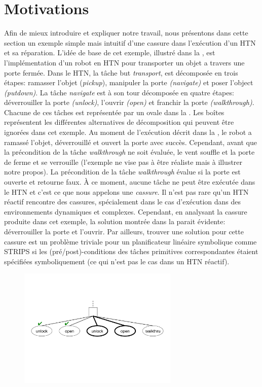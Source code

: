 \documentclass[a4paper,twoside,french]{article}
\begin{document}
		\section{Motivations}
		Afin de mieux introduire et expliquer notre travail, nous présentons dans cette section un exemple simple mais intuitif d'une cassure dans l'exécution d'un HTN et sa réparation. L'idée de base de cet exemple, illustré dans la  , est l'implémentation d'un robot en HTN pour transporter un objet a travers une porte fermée. Dans le HTN, la tâche but {\em transport}, est décomposée en trois étapes: ramasser l'objet ({\em pickup}), manipuler la porte {\em(navigate)} et poser l'object {\em(putdown)}. La tâche {\em navigate} est à son tour décomposée en quatre étapes: déverrouiller  la porte {\em(unlock)}, l'ouvrir {\em(open)} et franchir la porte {\em(walkthrough)}. Chacune de ces tâches est représentée par un ovale dans la . Les boîtes représentent les différentes alternatives de décomposition qui peuvent être ignorées dans cet exemple. Au moment de l'exécution décrit dans la , le robot a ramassé l'objet, déverrouillé et ouvert la porte avec succès. Cependant, avant que la précondition de la tâche {\em walkthrough} ne soit évaluée, le vent souffle et la porte de ferme et se verrouille (l'exemple ne vise pas à être réaliste mais à illustrer notre propos). La précondition de la tâche {\em walkthrough} évalue si la porte est ouverte et retourne faux. À ce moment, aucune tâche ne peut être exécutée dans le HTN et c'est ce que nous appelons une {\em cassure}. Il n'est pas rare qu'un HTN réactif rencontre des cassures, spécialement dans le cas d'exécution dans des environnements dynamiques et complexes. Cependant, en analysant la cassure produite dans cet exemple, la solution montrée dans la  parait évidente: déverrouiller la porte et l'ouvrir. Par ailleurs, trouver une solution pour cette cassure est un problème triviale pour un planificateur linéaire symbolique comme STRIPS si les (pré/post)-conditions des tâches primitives correspondantes étaient spécifiées symboliquement (ce qui n'est pas le cas dans un HTN réactif).		
			\begin{figure}[t]
				\centerline{\includegraphics[width=3in]{figs/recover}}
				\vskip 8pt
			\end{figure}
	
\end{document}
